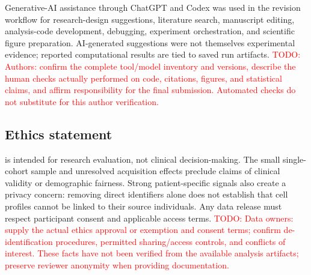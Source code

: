 \documentclass{article} %
\newcommand{\todo}[1]{\textcolor{red}{TODO: #1}}
\begin{document}
Generative-AI assistance through ChatGPT and Codex was used in the revision
workflow for research-design suggestions, literature search, manuscript editing,
analysis-code development, debugging, experiment orchestration, and scientific
figure preparation. AI-generated suggestions were not themselves experimental
evidence; reported computational results are tied to saved run artifacts.
\todo{Authors: confirm the complete tool/model inventory and versions, describe
the human checks actually performed on code, citations, figures, and statistical
claims, and affirm responsibility for the final submission. Automated checks
do not substitute for this author verification.}



\subsection*{Ethics statement}

\ourbench{} is intended for research evaluation, not clinical decision-making.
The small single-cohort sample and unresolved acquisition effects preclude
claims of clinical validity or demographic fairness. Strong patient-specific
signals also create a privacy concern: removing direct identifiers alone does
not establish that cell profiles cannot be linked to their source individuals.
Any data release must respect participant consent and applicable access terms.
\todo{Data owners: supply the actual ethics approval or exemption and consent
terms; confirm de-identification procedures, permitted sharing/access controls,
and conflicts of interest. These facts have not been verified from the available
analysis artifacts; preserve reviewer anonymity when providing documentation.}
\end{document}
